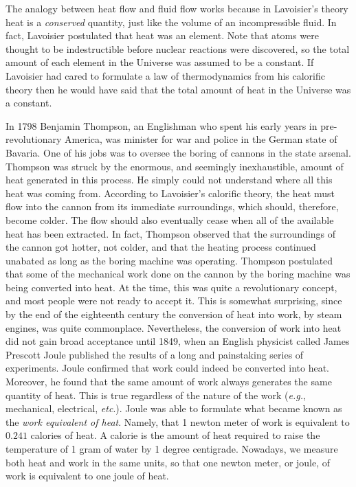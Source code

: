 The analogy between heat flow and fluid flow works because in Lavoisier's theory
heat is a {\em conserved}\/ quantity, just 
like the volume of an incompressible fluid. In fact,
Lavoisier postulated that heat was an element. Note that 
atoms were thought to be indestructible 
before
nuclear reactions were discovered, so the 
total amount of each element in the Universe was assumed to be a constant.
If Lavoisier had cared to formulate a law of thermodynamics from his calorific
theory then
he would have said that the total amount of heat in the Universe was a constant.
 

In 1798 Benjamin Thompson, an Englishman who spent his early years in 
pre-revolutionary
America, was  minister for war and police in the German state of Bavaria.
One of his jobs was to oversee the boring of cannons in the state arsenal. 
Thompson was struck by the
enormous, and seemingly inexhaustible, amount of heat generated in this process.
 He simply could not  understand where all this
heat was coming from. According to Lavoisier's calorific theory,  the heat 
must flow into the cannon from its immediate surroundings, which should, therefore,
 become colder.
The flow should  also  eventually cease when all of the available heat has been
extracted.
In fact, Thompson observed that the surroundings of the cannon
got hotter, not colder,
and that the heating process  continued unabated  as long as the
boring machine was operating. Thompson postulated that some of the mechanical
work done
on the cannon by the boring machine was being converted into heat. At the time,
this was quite a revolutionary concept, and most people were not ready to accept it.
This is somewhat surprising, since by the end of the eighteenth century
the conversion of heat into
work, by steam engines, was quite commonplace.
Nevertheless, the conversion of work into heat did not gain broad acceptance until
1849, when an English physicist called
 James Prescott Joule published the results of a long and
painstaking series of experiments. Joule confirmed that work could  indeed 
be converted
into heat. Moreover, he found that the same amount of work always generates
 the same quantity of
heat. This is
 true regardless of the nature of the work ({\em e.g.}, mechanical, electrical,
{\em etc}.). Joule was able to formulate what became known as
the {\em work equivalent of heat}. 
Namely, that 1 newton meter of work is equivalent to $0.241$ calories of heat.
A calorie is the amount of heat required to raise the temperature of 1 gram of
water by 1 degree centigrade. Nowadays, we measure both heat and work in the
same units, so that one newton meter, or joule, of work is equivalent to
one joule of heat.

